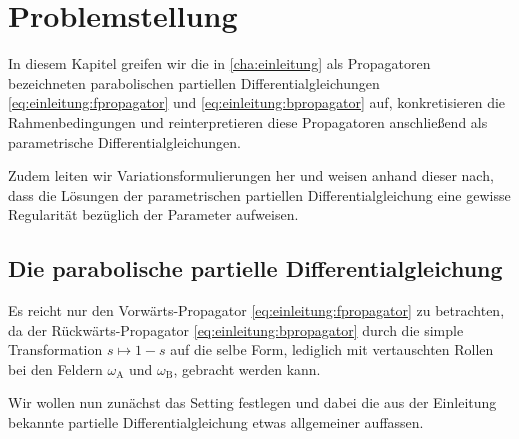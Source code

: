 
\chapter{Problemstellung} %
\label{cha:parametrische_problem_neuer_versuch}

In diesem Kapitel greifen wir die in \autoref{cha:einleitung} als Propagatoren bezeichneten parabolischen partiellen Differentialgleichungen \eqref{eq:einleitung:fpropagator} und \eqref{eq:einleitung:bpropagator} auf, konkretisieren die Rahmenbedingungen und reinterpretieren diese Propagatoren anschließend als parametrische Differentialgleichungen.

Zudem leiten wir Variationsformulierungen her und weisen anhand dieser nach, dass die Lösungen der parametrischen partiellen Differentialgleichung eine gewisse Regularität bezüglich der Parameter aufweisen.


\section{Die parabolische partielle Differentialgleichung} %
\label{sec:die_parabolische_partielle_differentialgleichung}

Es reicht nur den Vorwärts-Propagator \eqref{eq:einleitung:fpropagator} zu betrachten, da der Rückwärts-Propagator \eqref{eq:einleitung:bpropagator} durch die simple Transformation $s \mapsto 1 - s$ auf die selbe Form, lediglich mit vertauschten Rollen bei den Feldern $\omega_{\mathrm{A}}$ und $\omega_{\mathrm{B}}$, gebracht werden kann.

Wir wollen nun zunächst das Setting festlegen und dabei die aus der Einleitung bekannte partielle Differentialgleichung etwas allgemeiner auffassen.


